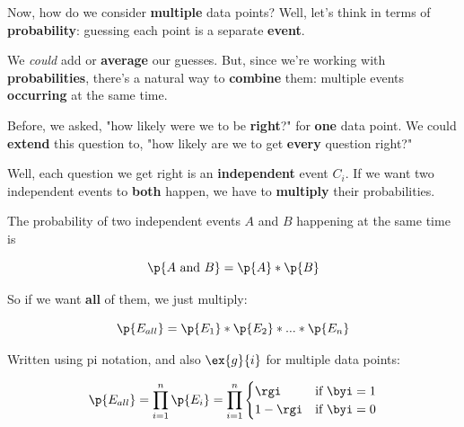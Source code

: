         Now, how do we consider \textbf{multiple} data points? Well, let's think in terms of \textbf{probability}: guessing each point is a separate \textbf{event}.
        
        We \textit{could} add or \textbf{average} our guesses. But, since we're working with \textbf{probabilities}, there's a natural way to \textbf{combine} them: multiple events \textbf{occurring} at the same time.
        
        Before, we asked, "how likely were we to be \textbf{right}?" for \textbf{one} data point. We could \textbf{extend} this question to, "how likely are we to get \textbf{every} question right?"
        
        Well, each question we get right is an \textbf{independent} event $C_i$. If we want two independent events to \textbf{both} happen, we have to \textbf{multiply} their probabilities.\\
        
        \begin{kequation}
            The probability of two independent events $A$ and $B$ happening at the same time is
            
            \begin{equation*}
                \p{A \text{ and } B} = \p{A} * \p{B}
            \end{equation*}
        \end{kequation}

        
        So if we want \textbf{all} of them, we just multiply:
        
        \begin{equation}
            \p{E_{all}} = \p{E_1} * \p{E_2} * ...
            * \p{E_n}
        \end{equation}
        
        Written using pi notation, and also $\ex{g}{i}$ for multiple data points:
            
        \begin{equation}
            \p{E_{all}} = \prod_{i = 1}^n \p{E_i} = \prod_{i = 1}^n \begin{cases}
                \rgi & 
                \text{if } \byi=1 \\
                1-\rgi & 
                \text{if } \byi=0
            \end{cases}
        \end{equation}
        
